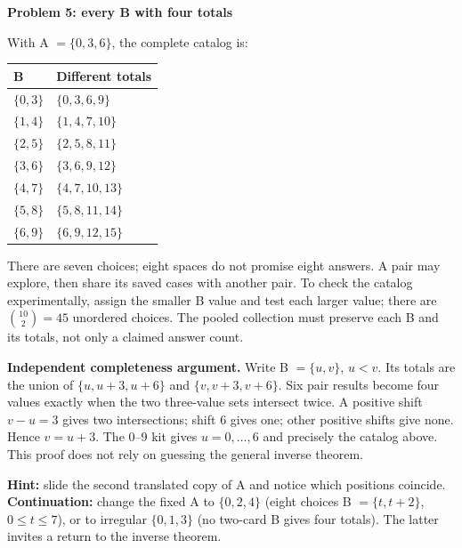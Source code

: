 \documentclass[11pt]{article}
\newcommand{\heading}[1]{\vspace{4pt}{\large\bfseries #1}\par}
\newcommand{\sub}[1]{\textbf{#1}\par}
\newcommand{\sset}[1]{\{#1\}}
\newcommand{\smalltable}{\small\renewcommand{\arraystretch}{1.2}}
\begin{document}
\heading{Problems 5--7: common gaps and the singleton exception}
\sub{Problem 5: every B with four totals}
With A $=\sset{0,3,6}$, the complete catalog is:
\begin{center}\smalltable
\begin{tabular}{@{}ll@{}}\toprule B & Different totals\\\midrule
$\sset{0,3}$ & $\sset{0,3,6,9}$\\
$\sset{1,4}$ & $\sset{1,4,7,10}$\\
$\sset{2,5}$ & $\sset{2,5,8,11}$\\
$\sset{3,6}$ & $\sset{3,6,9,12}$\\
$\sset{4,7}$ & $\sset{4,7,10,13}$\\
$\sset{5,8}$ & $\sset{5,8,11,14}$\\
$\sset{6,9}$ & $\sset{6,9,12,15}$\\\bottomrule
\end{tabular}\end{center}
There are seven choices; eight spaces do not promise eight answers. A pair may explore, then share its saved cases with another pair. To check the catalog experimentally, assign the smaller B value and test each larger value; there are $\binom{10}{2}=45$ unordered choices. The pooled collection must preserve each B and its totals, not only a claimed answer count.

\textbf{Independent completeness argument.} Write B $=\sset{u,v}$, $u<v$. Its totals are the union of $\sset{u,u+3,u+6}$ and $\sset{v,v+3,v+6}$. Six pair results become four values exactly when the two three-value sets intersect twice. A positive shift $v-u=3$ gives two intersections; shift 6 gives one; other positive shifts give none. Hence $v=u+3$. The 0--9 kit gives $u=0,\ldots,6$ and precisely the catalog above. This proof does not rely on guessing the general inverse theorem.

\textbf{Hint:} slide the second translated copy of A and notice which positions coincide. \textbf{Continuation:} change the fixed A to $\sset{0,2,4}$ (eight choices B $=\sset{t,t+2}$, $0\leq t\leq7$), or to irregular $\sset{0,1,3}$ (no two-card B gives four totals). The latter invites a return to the inverse theorem.
\end{document}
